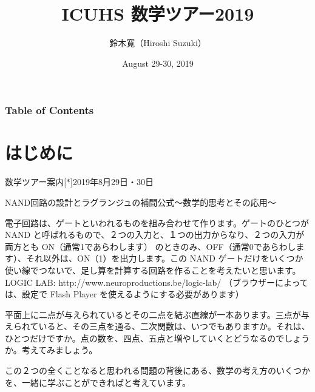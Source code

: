 \documentclass[10pt, dvipdfmx]{beamer}
\title[ICUHS 数学ツアー2019]{ICUHS 数学ツアー2019 }
\author[H. Suzuki]{鈴木寛（Hiroshi Suzuki）}            %
\institute[ICU]{国際基督教大学（International Christian University）}  %
\date[2019/8/29-30]{August 29-30, 2019}
\begin{document}
\begin{frame}
\titlepage                    %
\end{frame}
\begin{frame}                  %
\frametitle{Table of Contents}%
\tableofcontents

\vfill
\end{frame}

\section{はじめに}

\begin{frame}{数学ツアー案内\hfill [$\ast$]}{2019年8月29日・30日 }

\begin{block}{NAND回路の設計とラグランジュの補間公式〜数学的思考とその応用〜}

電子回路は、ゲートといわれるものを組み合わせて作ります。ゲートのひとつが NAND と呼ばれるもので、２つの入力と、１つの出力からなり、２つの入力が両方とも ON（通常1であらわします） のときのみ、OFF（通常0であらわします）、それ以外は、ON（1）を出力します。この NAND ゲートだけをいくつか使い線でつないで、足し算を計算する回路を作ることを考えたいと思います。
LOGIC LAB: http://www.neuroproductions.be/logic-lab/ （ブラウザーによっては、設定で Flash Player を使えるようにする必要があります）

平面上に二点が与えられているとその二点を結ぶ直線が一本あります。三点が与えられていると、その三点を通る、二次関数は、いつでもありますか。それは、ひとつだけですか。点の数を、四点、五点と増やしていくとどうなるのでしょうか。考えてみましょう。

この２つの全くことなると思われる問題の背後にある、数学の考え方のいくつかを、一緒に学ぶことができればと考えています。
\end{block}
\end{frame}
\end{document}
